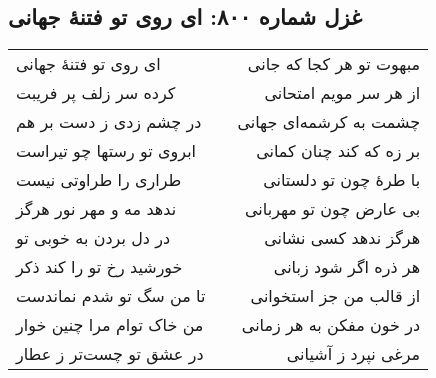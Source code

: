 \begin{center}
\section*{غزل شماره ۸۰۰: ای روی تو فتنهٔ جهانی}
\label{sec:800}
\begin{longtable}{l p{0.5cm} r}
ای روی تو فتنهٔ جهانی
&&
مبهوت تو هر کجا که جانی
\\
کرده سر زلف پر فریبت
&&
از هر سر مویم امتحانی
\\
در چشم زدی ز دست بر هم
&&
چشمت به کرشمه‌ای جهانی
\\
ابروی تو رستها چو تیراست
&&
بر زه که کند چنان کمانی
\\
طراری را طراوتی نیست
&&
با طرهٔ چون تو دلستانی
\\
ندهد مه و مهر نور هرگز
&&
بی عارض چون تو مهربانی
\\
در دل بردن به خوبی تو
&&
هرگز ندهد کسی نشانی
\\
خورشید رخ تو را کند ذکر
&&
هر ذره اگر شود زبانی
\\
تا من سگ تو شدم نماندست
&&
از قالب من جز استخوانی
\\
من خاک توام مرا چنین خوار
&&
در خون مفکن به هر زمانی
\\
در عشق تو چست‌تر ز عطار
&&
مرغی نپرد ز آشیانی
\\
\end{longtable}
\end{center}
